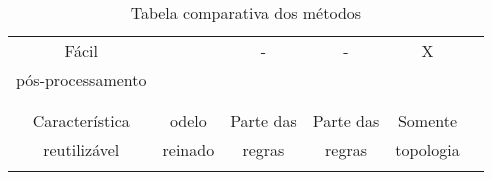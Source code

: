 \begin{table}
\begin{center}
\begin{tabular}{|c|c|c|c|c|c|}
       Fácil             &      &    -     &      -       &      X     \\
       pós-processamento &      &          &              &            \\
                         &      &          &              &            \\
       \hline
                         &         &           &           &          \\
       Característica    & odelo   & Parte das & Parte das & Somente  \\
       reutilizável      & reinado & regras    & regras    & topologia\\
                         &         &           &           &          \\
       \hline
     \end{tabular}
   \caption{Tabela comparativa dos métodos}
   \label{table:metodos}
   \end{center}
 \end{table}

